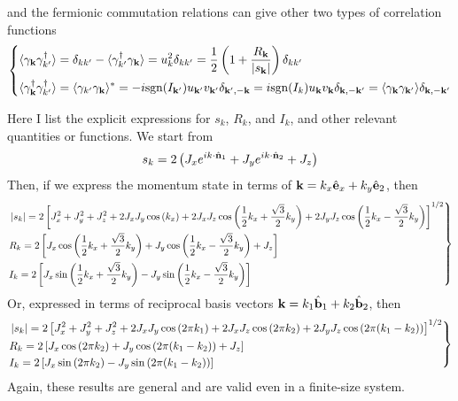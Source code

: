 and the fermionic commutation relations can give other two types of correlation functions
\[
\left\{
\begin{aligned}
& \langle \gamma_{\mathbf{k}}\gamma_{k'}^\dagger \rangle = \delta_{kk'} - \langle \gamma^\dagger_{k'}\gamma_{\mathbf{k}} \rangle = u^2_k\delta_{kk'} = \frac{1}{2}\left( 1+\frac{R_{\mathbf{k}}}{\left| s_{\mathbf{k}} \right|} \right)\delta_{kk'} \\
& \langle \gamma_{\mathbf{k}}^\dagger\gamma_{k'}^\dagger \rangle = \langle \gamma_{k'}\gamma_{\mathbf{k}} \rangle^* = -i\mathrm{sgn}(I_{\mathbf{k}'})u_{\mathbf{k}'}v_{\mathbf{k}'}\delta_{\mathbf{k}',-\mathbf{k}} = i\mathrm{sgn}(I_{k})u_{\mathbf{k}}v_{\mathbf{k}}\delta_{\mathbf{k},-\mathbf{k}'} = \langle \gamma_{\mathbf{k}}\gamma_{\mathbf{k}'} \rangle \delta_{\mathbf{k},-\mathbf{k}'}
\end{aligned}
\right.
\]

Here I list the explicit expressions for $s_k$, $R_k$, and $I_k$, and other relevant quantities or functions. We start from 
\[
s_k = 2\left( J_x e^{ik\cdot \hat{\mathbf{n}}_1} + J_y e^{ik\cdot \hat{\mathbf{n}}_2} + J_z \right)
\]
Then, if we express the momentum state in terms of $\mathbf{k} = k_x\hat{\mathbf{e}}_x + k_y\hat{\mathbf{e}}_2$, then
\begin{equation}\label{eq:functions}
  \left.
  \begin{aligned}
  &\left| s_k \right| = 2\left[ J_x^2+J_y^2+J_z^2 + 2J_xJ_y\cos\left( k_x \right) + 2J_xJ_z\cos\left( \frac{1}{2}k_x+\frac{\sqrt{3}}{2}k_y \right) + 2J_yJ_z\cos\left( \frac{1}{2}k_x-\frac{\sqrt{3}}{2}k_y \right) \right]^{1/2} \\
  & R_k = 2\left[ J_x\cos\left( \frac{1}{2}k_x+\frac{\sqrt{3}}{2}k_y \right) + J_y\cos\left( \frac{1}{2}k_x-\frac{\sqrt{3}}{2}k_y \right) + J_z \right]\\
  &I_k = 2\left[ J_x\sin\left( \frac{1}{2}k_x+\frac{\sqrt{3}}{2}k_y \right) - J_y\sin\left( \frac{1}{2}k_x-\frac{\sqrt{3}}{2}k_y \right) \right]
  \end{aligned}
  \right\}
\end{equation}
Or, expressed in terms of reciprocal basis vectors $\mathbf{k} = k_1\hat{\mathbf{b}}_1 + k_2\hat{\mathbf{b}}_2$, then
\begin{equation}\label{eq:functions_b}
  \left.
  \begin{aligned}
  &\left| s_k \right| 
  = 
  2\left[ 
      J_x^2+J_y^2+J_z^2 + 2J_xJ_y\cos\left( 2\pi k_1 \right) 
      + 
      2J_xJ_z\cos\left( 2\pi k_2 \right) 
      + 
      2J_yJ_z\cos\left( 2\pi (k_1 - k_2) \right)
   \right]^{1/2} \\
  & R_k 
  = 2\left[ 
      J_x\cos\left( 2\pi k_2 \right) 
      + 
      J_y\cos\left( 2\pi (k_1 - k_2) \right) 
      + 
      J_z
   \right]\\
  &I_k 
  = 2\left[ 
      J_x\sin\left( 2\pi k_2 \right) 
      - 
      J_y\sin\left( 2\pi (k_1 - k_2) \right)
   \right]
  \end{aligned}
  \right\}
\end{equation}
Again, these results are general and are valid even in a finite-size system.

